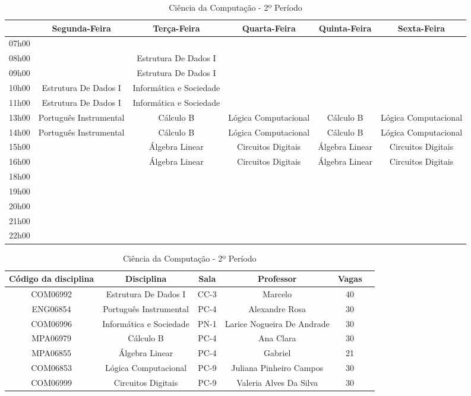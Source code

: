 \begin{apendices}
\begin{table}[!h]
\begin{adjustbox}{width=1\textwidth,center=\textwidth}
\centering
\begin{tabular}{|c|c|c|c|c|c|}
\hline
 & Segunda-Feira & Terça-Feira & Quarta-Feira & Quinta-Feira & Sexta-Feira \\ \hline
07h00 &  &  &  &  &  \\ \hline
08h00 &  & Estrutura De Dados I &  &  &  \\ \hline
09h00 &  & Estrutura De Dados I &  &  &  \\ \hline
10h00 & Estrutura De Dados I & Informática e Sociedade &  &  &  \\ \hline
11h00 & Estrutura De Dados I & Informática e Sociedade &  &  &  \\ \hline
13h00 & Português Instrumental & Cálculo B & Lógica Computacional & Cálculo B & Lógica Computacional \\ \hline
14h00 & Português Instrumental & Cálculo B & Lógica Computacional & Cálculo B & Lógica Computacional \\ \hline
15h00 &  & Álgebra Linear & Circuitos Digitais & Álgebra Linear & Circuitos Digitais \\ \hline
16h00 &  & Álgebra Linear & Circuitos Digitais & Álgebra Linear & Circuitos Digitais \\ \hline
18h00 &  &  &  &  &  \\ \hline
19h00 &  &  &  &  &  \\ \hline
20h00 &  &  &  &  &  \\ \hline
21h00 &  &  &  &  &  \\ \hline
22h00 &  &  &  &  &  \\ \hline
\end{tabular}
\end{adjustbox}
\begin{adjustbox}{width=1\textwidth,center=\textwidth}
\centering
\begin{tabular}{|c|c|c|c|c|c|}
\hline
\textbf{Código da disciplina} & \textbf{Disciplina} & \textbf{Sala} & \textbf{Professor} & \textbf{Vagas} \\ \hline
COM06992 & Estrutura De Dados I & CC-3 & Marcelo & 40 \\ \hline
ENG06854 & Português Instrumental & PC-4 & Alexandre Rosa & 30 \\ \hline
COM06996 & Informática e Sociedade & PN-1 & Larice Nogueira De Andrade & 30 \\ \hline
MPA06979 & Cálculo B & PC-4 & Ana Clara & 30 \\ \hline
MPA06855 & Álgebra Linear & PC-4 & Gabriel & 21 \\ \hline
COM06853 & Lógica Computacional & PC-9 & Juliana Pinheiro Campos & 30 \\ \hline
COM06999 & Circuitos Digitais & PC-9 & Valeria Alves Da Silva & 30 \\ \hline
\end{tabular}
\end{adjustbox}
\caption{Ciência da Computação - 2º Período}
\end{table}



\end{apendices}
